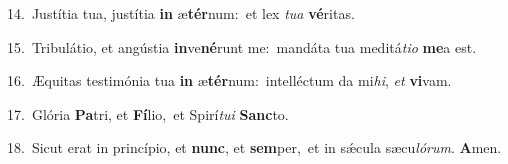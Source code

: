 {\numbfont\textcolor{\numbcolor}{14.}}~Justítia tua, justítia \textbf{in} æ\-\textbf{tér}\-num:~\star et lex \textit{tu}\-\textit{a} \textbf{vé}\-ritas.\par
{\numbfont\textcolor{\numbcolor}{15.}}~Tribulátio, et angústia \textbf{in}\-ve\-\textbf{né}\-runt me:~\star mandáta tua meditá\-\textit{ti}\-\textit{o} \textbf{me}\-a est.\par
{\numbfont\textcolor{\numbcolor}{16.}}~Æquitas testimónia tua \textbf{in} æ\-\textbf{tér}\-num:~\star intelléctum da mi\-\textit{hi}\-, \textit{et} \textbf{vi}\-vam.\par
{\numbfont\textcolor{\numbcolor}{17.}}~Glória \textbf{Pa}\-tri, et \textbf{Fí}\-lio,~\star et Spirí\-\textit{tu}\-\textit{i} \textbf{Sanc}\-to.\par
{\numbfont\textcolor{\numbcolor}{18.}}~Sicut erat in princípio, et \textbf{nunc}\-, et \textbf{sem}\-per,~\star et in sǽcula sæcu\-\textit{ló}\-\textit{rum}. \textbf{A}\-men.\par
